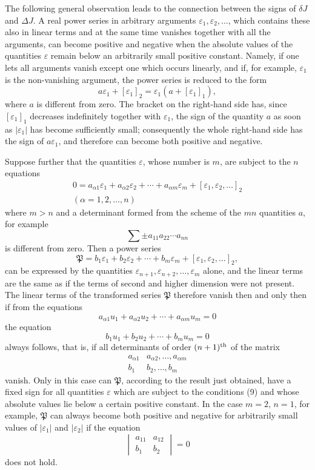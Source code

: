 \documentclass[11pt,a4paper,leqno]{article}
\begin{document}
The following general observation leads to the connection between the signs of $\delta J$ and $\Delta J$. A real power series in arbitrary arguments $\varepsilon_1,\varepsilon_2,\ldots$, which contains these also in linear terms and at the same time vanishes together with all the arguments, can become positive and negative when the absolute values of the quantities $\varepsilon$ remain below an arbitrarily small positive constant. Namely, if one lets all arguments vanish except one which occurs linearly, and if, for example, $\varepsilon_1$ is the non-vanishing argument, the power series is reduced to the form
\[
a\varepsilon_1+[\varepsilon_1]_2=\varepsilon_1(a+[\varepsilon_1]_1),
\]
where $a$ is different from zero. The bracket on the right-hand side has, since $[\varepsilon_1]_1$ decreases indefinitely together with $\varepsilon_1$, the sign of the quantity $a$ as soon as $|\varepsilon_1|$ has become sufficiently small; consequently the whole right-hand side has the sign of $a\varepsilon_1$, and therefore can become both positive and negative.

Suppose further that the quantities $\varepsilon$, whose number is $m$, are subject to the $n$ equations
\begin{equation}\tag{9}
\begin{gathered}
0=a_{\alpha 1}\varepsilon_1+a_{\alpha 2}\varepsilon_2+\cdots+a_{\alpha m}\varepsilon_m+[\varepsilon_1,\varepsilon_2,\ldots]_2\\
(\alpha=1,2,\ldots,n)
\end{gathered}
\end{equation}
where $m>n$ and a determinant formed from the scheme of the $mn$ quantities $a$, for example
\[
\sum \pm a_{11}a_{22}\cdots a_{nn}
\]
is different from zero. Then a power series
\[
\mathfrak{P}=b_1\varepsilon_1+b_2\varepsilon_2+\cdots+b_m\varepsilon_m+[\varepsilon_1,\varepsilon_2,\ldots]_2,
\]
can be expressed by the quantities $\varepsilon_{n+1},\varepsilon_{n+2},\ldots,\varepsilon_m$ alone, and the linear terms are the same as if the terms of second and higher dimension were not present. The linear terms of the transformed series $\mathfrak{P}$ therefore vanish then and only then if from the equations
\[
a_{\alpha1}u_1+a_{\alpha2}u_2+\cdots+a_{\alpha m}u_m=0
\]
the equation
\[
b_1u_1+b_2u_2+\cdots+b_mu_m=0
\]
always follows, that is, if all determinants of order $(n+1)^{\rm th}$ of the matrix
\[
\begin{matrix}
a_{\alpha1} & a_{\alpha2},\ldots, a_{\alpha m}\\
b_1 & b_2,\ldots, b_m
\end{matrix}
\]
vanish. Only in this case can $\mathfrak{P}$, according to the result just obtained, have a fixed sign for all quantities $\varepsilon$ which are subject to the conditions (9) and whose absolute values lie below a certain positive constant. In the case $m=2$, $n=1$, for example, $\mathfrak{P}$ can always become both positive and negative for arbitrarily small values of $|\varepsilon_1|$ and $|\varepsilon_2|$ if the equation
\[
\begin{vmatrix}
a_{11} & a_{12}\\
b_1 & b_2
\end{vmatrix}=0
\]
does not hold.
\end{document}
